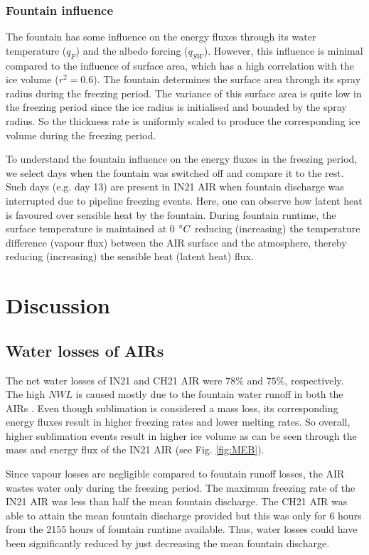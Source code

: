 \documentclass[utf8]{frontiersSCNS} %
\begin{document}
\subsubsection{Fountain influence}

The fountain has some influence on the energy fluxes through its water temperature ($q_{F}$) and the albedo forcing
($q_{SW}$). However, this influence is minimal compared to the influence of surface area, which has a high
correlation with the ice volume ($r^2=0.6$). The fountain determines the surface area through its spray radius
during the freezing period. The variance of this surface area is quite low in the freezing period since the ice
radius is initialised and bounded by the spray radius. So the thickness rate is uniformly scaled to produce the
corresponding ice volume during the freezing period.

To understand the fountain influence on the energy fluxes in the freezing period, we select days when the fountain
was switched off and compare it to the rest. Such days (e.g. day 13) are present in IN21 AIR when fountain
discharge was interrupted due to pipeline freezing events. Here, one can observe how latent heat is favoured over
sensible heat by the fountain. During fountain runtime, the surface temperature is maintained at 0 $\degree C$
reducing (increasing) the temperature difference (vapour flux) between the AIR surface and the atmosphere, thereby
reducing (increasing) the sensible heat (latent heat) flux.

\section{Discussion}

\subsection{Water losses of AIRs}

The net water losses of IN21 and CH21 AIR were $78\%$ and $75\%$, respectively. The high $NWL$ is caused mostly due
to the fountain water runoff in both the AIRs . Even though sublimation is considered a mass loss, its
corresponding energy fluxes result in higher freezing rates and lower melting rates. So overall, higher sublimation
events result in higher ice volume as can be seen through the mass and energy flux of the IN21 AIR (see Fig.
\ref{fig:MEB}).

Since vapour losses are negligible compared to fountain runoff losses, the AIR wastes water only during the
freezing period. The maximum freezing rate of the IN21 AIR was less than half the mean fountain discharge. The CH21
AIR was able to attain the mean fountain discharge provided but this was only for 6 hours from the 2155 hours of
fountain runtime available. Thus, water losses could have been significantly reduced by just decreasing the mean
fountain discharge.
\end{document}
